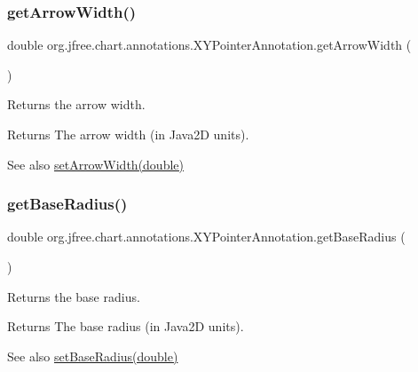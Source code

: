 \subsubsection{\texorpdfstring{get\+Arrow\+Width()}{getArrowWidth()}}
{\footnotesize\ttfamily double org.\+jfree.\+chart.\+annotations.\+X\+Y\+Pointer\+Annotation.\+get\+Arrow\+Width (\begin{DoxyParamCaption}{ }\end{DoxyParamCaption})}

Returns the arrow width.

\begin{DoxyReturn}{Returns}
The arrow width (in Java2D units).
\end{DoxyReturn}
\begin{DoxySeeAlso}{See also}
\mbox{\hyperlink{classorg_1_1jfree_1_1chart_1_1annotations_1_1_x_y_pointer_annotation_a1b32ced8b4ccb41c6e7fe98ca225f726}{set\+Arrow\+Width(double)}} 
\end{DoxySeeAlso}
\mbox{\label{classorg_1_1jfree_1_1chart_1_1annotations_1_1_x_y_pointer_annotation_a7dd9c99999b7faf6911d9fc400e809f9}} 
\subsubsection{\texorpdfstring{get\+Base\+Radius()}{getBaseRadius()}}
{\footnotesize\ttfamily double org.\+jfree.\+chart.\+annotations.\+X\+Y\+Pointer\+Annotation.\+get\+Base\+Radius (\begin{DoxyParamCaption}{ }\end{DoxyParamCaption})}

Returns the base radius.

\begin{DoxyReturn}{Returns}
The base radius (in Java2D units).
\end{DoxyReturn}
\begin{DoxySeeAlso}{See also}
\mbox{\hyperlink{classorg_1_1jfree_1_1chart_1_1annotations_1_1_x_y_pointer_annotation_a18b4429ee9df0dd4cb350f32defa55b8}{set\+Base\+Radius(double)}} 
\end{DoxySeeAlso}
\mbox{\label{classorg_1_1jfree_1_1chart_1_1annotations_1_1_x_y_pointer_annotation_aaced523c72b3024fad2fcd423eaccd7c}} 
